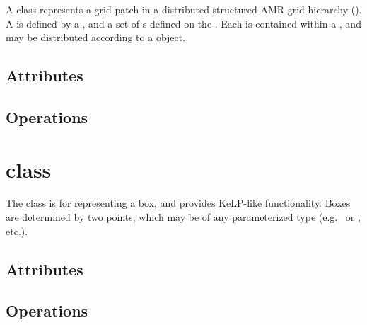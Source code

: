A  class represents a grid patch in a distributed structured
AMR grid hierarchy ().  A  is defined by a
, and a set of s defined on the .  Each
 is contained within a , and may be distributed
according to a  object.

\subsection{Attributes}

\subsection{Operations}

\section{ class}

The  class is for representing a box, and provides KeLP-like functionality.
Boxes are determined by two points, which may be of any parameterized type
(e.g.~ or , etc.).


\subsection{Attributes}

\subsection{Operations}



